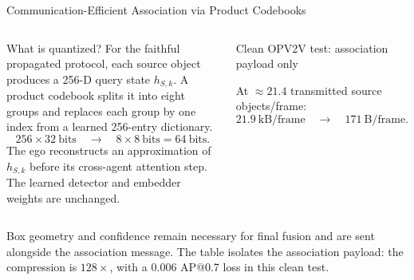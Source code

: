 \documentclass[aspectratio=169,10pt]{beamer}
\begin{document}
\begin{frame}{Communication-Efficient Association via Product Codebooks}
\small
\begin{columns}[T,onlytextwidth]
\begin{block}{What is quantized?}
For the faithful propagated protocol, each source object produces a 256-D
query state $h_{S,k}$. A product codebook splits it into eight groups and
replaces each group by one index from a learned 256-entry dictionary.
\[
256\times32\ \text{bits}\quad\longrightarrow\quad8\times8\ \text{bits}=64\ \text{bits}.
\]
The ego reconstructs an approximation of $h_{S,k}$ before its cross-agent
attention step. The learned detector and embedder weights are unchanged.
\end{block}

\begin{block}{Clean OPV2V test: association payload only}
\centering
{}

\vspace{2mm}
At $\approx21.4$ transmitted source objects/frame:
\[
21.9\ \text{kB/frame}\quad\longrightarrow\quad171\ \text{B/frame}.
\]
\end{block}
\end{columns}

\vspace{3mm}\footnotesize
Box geometry and confidence remain necessary for final fusion and are sent
alongside the association message. The table isolates the association payload:
the compression is $128\times$, with a $0.006$ AP@0.7 loss in this clean test.
\end{frame}
\end{document}
